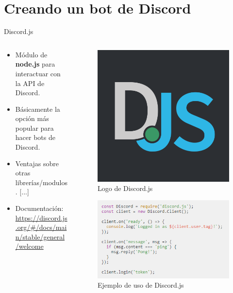 \documentclass[10pt]{beamer} %
\begin{document}
\section{Creando un bot de Discord}

\begin{frame}{Discord.js}
\begin{columns}
\begin{column}{.5\linewidth}
    \begin{itemize}
        \item Módulo de \textbf{node.js} para interactuar con la API de Discord.
        \item Básicamente la opción más popular para hacer bots de Discord.
        \item Ventajas sobre otras librerías/modulos. [...]
        \item Documentación: \\ \url{https://discord.js.org/#/docs/main/stable/general/welcome}
    \end{itemize}
\end{column}
\begin{column}{.5\linewidth}
    \begin{figure}
        \centering
        \includegraphics[width=0.4\linewidth]{djs.png}
        \caption{Logo de Discord.js}
        \label{fig:logo Djs}
    \end{figure}
    \vspace{-.5cm}
    \begin{figure}
        \centering
        \includegraphics[width=1\linewidth]{example.png}
        \caption{Ejemplo de uso de Discord.js}
        \label{fig:Djs ex}
    \end{figure}
\end{column}
\end{columns}
\end{frame}
\end{document}
